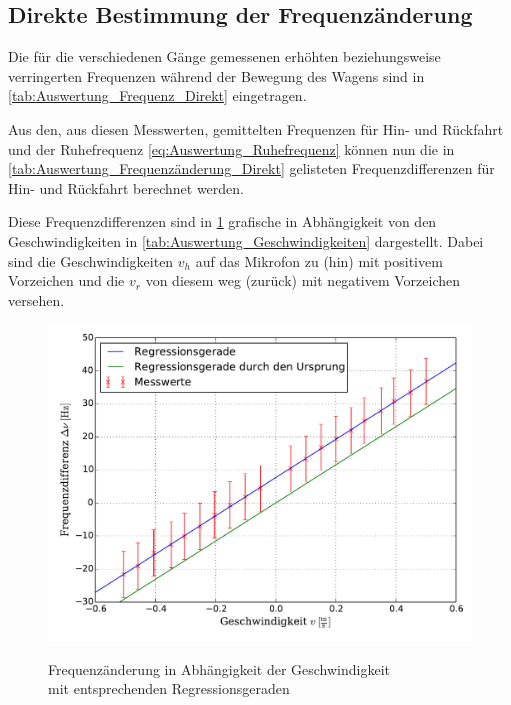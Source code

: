 \subsection{Direkte Bestimmung der Frequenzänderung}
\label{sec:Auswertung_Direkt}
	Die für die verschiedenen Gänge gemessenen erhöhten beziehungsweise verringerten Frequenzen 
	während der Bewegung des Wagens sind in \cref{tab:Auswertung_Frequenz_Direkt} eingetragen.
	
	
	
	Aus den, aus diesen Messwerten, gemittelten Frequenzen für Hin- und Rückfahrt und der Ruhefrequenz
	\cref{eq:Auswertung_Ruhefrequenz} können nun die in \cref{tab:Auswertung_Frequenzänderung_Direkt} gelisteten 
	Frequenzdifferenzen für Hin- und Rückfahrt berechnet werden.
	
	  
	
	Diese Frequenzdifferenzen sind in \cref{fig:Auswertung_Frequenzänderung_direkt} grafische in Abhängigkeit von den 
	Geschwindigkeiten in \cref{tab:Auswertung_Geschwindigkeiten} dargestellt.
	Dabei sind die Geschwindigkeiten $ v_{h} $ auf das Mikrofon zu (hin) mit positivem Vorzeichen  
	und die $ v_{r} $ von diesem weg (zurück) mit negativem Vorzeichen versehen.
	
	\begin{figure}[!h]
		\centering
		\includegraphics[scale=0.7]{Grafiken/Frequenzdifferenz_direkt.pdf}
		\label{fig:Auswertung_Frequenzänderung_direkt}
		\caption{Frequenzänderung in Abhängigkeit der Geschwindigkeit\\\hspace*{2.6cm} mit entsprechenden Regressionsgeraden}
	\end{figure}  
	
